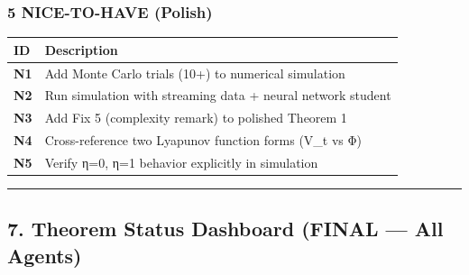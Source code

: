 \documentclass[
  12pt,
]{ctexart}
\begin{document}
\subsubsection{5 NICE-TO-HAVE (Polish)}\label{nice-to-have-polish}

\begin{longtable}[]{@{}ll@{}}
\toprule\noalign{}
ID & Description \\
\midrule\noalign{}
\endhead
\bottomrule\noalign{}
\endlastfoot
\textbf{N1} & Add Monte Carlo trials (10+) to numerical simulation \\
\textbf{N2} & Run simulation with streaming data + neural network
student \\
\textbf{N3} & Add Fix 5 (complexity remark) to polished Theorem 1 \\
\textbf{N4} & Cross-reference two Lyapunov function forms (V\_t vs Φ) \\
\textbf{N5} & Verify η=0, η=1 behavior explicitly in simulation \\
\end{longtable}

\begin{center}\rule{0.5\linewidth}{0.5pt}\end{center}

\subsection{7. Theorem Status Dashboard (FINAL --- All
Agents)}\label{theorem-status-dashboard-final-all-agents}
\end{document}
